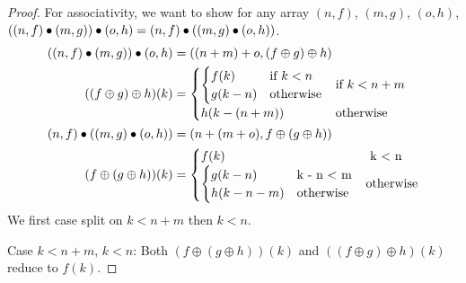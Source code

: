 \begin{toappendix}
\begin{proof}
        For associativity, we want to show for any array $(n, f)$, $(m, g)$, $(o, h)$,
        $((n, f) \mathbin{\bullet} (m, g)) \mathbin{\bullet} (o, h) = (n, f) \mathbin{\bullet} ((m, g) \mathbin{\bullet} (o, h))$.
        \begin{align*}
            ((n, f) \mathbin{\bullet} (m, g)) \mathbin{\bullet} (o, h) & = ((n + m) + o, (f \oplus g) \oplus h)                        \\
            ((f \oplus g) \oplus h)(k)         & = \begin{cases}
                                                       \begin{cases}
                                                           f(k)     & \text{if}\ k < n \\
                                                           g(k - n) & \text{otherwise}
                                                       \end{cases}
                                                                      & \text{if}\ k < n + m \\
                                                       h(k - (n + m)) & \text{otherwise}
                                                   \end{cases}                   \\
            (n, f) \mathbin{\bullet} ((m, g) \mathbin{\bullet} (o, h)) & = (n + (m + o), f \oplus (g \oplus h))                        \\
            (f \oplus (g \oplus h))(k)         & = \begin{cases}
                                                       f(k)                                   & \ \text{k < n} \\
                                                       \begin{cases}
                                                           g(k - n)     & \text{k - n < m} \\
                                                           h(k - n - m) & \text{otherwise} \\
                                                       \end{cases} & \text{otherwise}
                                                   \end{cases}
        \end{align*}
        We first case split on $k < n + m$ then $k < n$.

        Case $k < n + m$, $k < n$: Both $(f \oplus (g \oplus h))(k)$ and $((f \oplus g) \oplus h)(k)$ reduce to $f(k)$.


\end{proof}
\end{toappendix}
